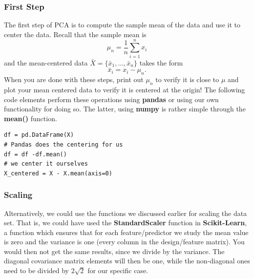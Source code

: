 \documentclass{beamer}
\begin{document}
\begin{frame}
\frametitle{First Step}

The first step of PCA is to compute the sample mean of the data and use it to center the data. Recall that the sample mean is
\[
\mu_n = \frac{1}{n} \sum_{i=1}^n x_i
\]
and the mean-centered data $\bar{X} = \{ \bar{x}_1, \ldots, \bar{x}_n \}$ takes the form
\[
\bar{x}_i = x_i - \mu_n.
\]
When you are done with these steps, print out $\mu_n$ to verify it is
close to $\mu$ and plot your mean centered data to verify it is
centered at the origin! 
The following code elements perform these operations using \textbf{pandas} or using our own functionality for doing so. The latter, using \textbf{numpy} is rather simple through the \textbf{mean()} function. 






\begin{verbatim}
df = pd.DataFrame(X)
# Pandas does the centering for us
df = df -df.mean()
# we center it ourselves
X_centered = X - X.mean(axis=0)

\end{verbatim}
\end{frame}

\begin{frame}
\frametitle{Scaling}

Alternatively, we could use the functions we discussed
earlier for scaling the data set.  That is, we could have used the
\textbf{StandardScaler} function in \textbf{Scikit-Learn}, a function which ensures
that for each feature/predictor we study the mean value is zero and
the variance is one (every column in the design/feature matrix).  You
would then not get the same results, since we divide by the
variance. The diagonal covariance matrix elements will then be one,
while the non-diagonal ones need to be divided by $2\sqrt{2}$ for our
specific case.
\end{frame}
\end{document}

